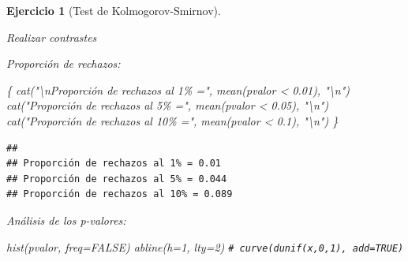 \documentclass[
]{book}
\newenvironment{Shaded}{\begin{snugshade}}{\end{snugshade}}
\newcommand{\AttributeTok}[1]{\textcolor[rgb]{0.77,0.63,0.00}{#1}}
\newcommand{\CommentTok}[1]{\textcolor[rgb]{0.56,0.35,0.01}{\textit{#1}}}
\newcommand{\ConstantTok}[1]{\textcolor[rgb]{0.00,0.00,0.00}{#1}}
\newcommand{\ControlFlowTok}[1]{\textcolor[rgb]{0.13,0.29,0.53}{\textbf{#1}}}
\newcommand{\DecValTok}[1]{\textcolor[rgb]{0.00,0.00,0.81}{#1}}
\newcommand{\FloatTok}[1]{\textcolor[rgb]{0.00,0.00,0.81}{#1}}
\newcommand{\FunctionTok}[1]{\textcolor[rgb]{0.00,0.00,0.00}{#1}}
\newcommand{\NormalTok}[1]{#1}
\newcommand{\OtherTok}[1]{\textcolor[rgb]{0.56,0.35,0.01}{#1}}
\newcommand{\SpecialCharTok}[1]{\textcolor[rgb]{0.00,0.00,0.00}{#1}}
\newcommand{\StringTok}[1]{\textcolor[rgb]{0.31,0.60,0.02}{#1}}
\theoremstyle{break}
\newtheorem{exercise}{Ejercicio}[chapter]
\theoremstyle{nonumberplain}
\renewcommand{\CommentTok}[1]{\textcolor[rgb]{0.41,0.41,0.41}{\texttt{#1}}}
\begin{document}
\begin{exercise}[Test de Kolmogorov-Smirnov]
\begin{enumerate}
  Realizar contrastes

\begin{Shaded}
\end{Shaded}

  Proporción de rechazos:

\begin{Shaded}
\begin{Highlighting}[]
\NormalTok{\{}
  \FunctionTok{cat}\NormalTok{(}\StringTok{"}\SpecialCharTok{\textbackslash{}n}\StringTok{Proporción de rechazos al 1\% ="}\NormalTok{, }\FunctionTok{mean}\NormalTok{(pvalor }\SpecialCharTok{\textless{}} \FloatTok{0.01}\NormalTok{), }\StringTok{"}\SpecialCharTok{\textbackslash{}n}\StringTok{"}\NormalTok{)}
  \FunctionTok{cat}\NormalTok{(}\StringTok{"Proporción de rechazos al 5\% ="}\NormalTok{, }\FunctionTok{mean}\NormalTok{(pvalor }\SpecialCharTok{\textless{}} \FloatTok{0.05}\NormalTok{), }\StringTok{"}\SpecialCharTok{\textbackslash{}n}\StringTok{"}\NormalTok{)}
  \FunctionTok{cat}\NormalTok{(}\StringTok{"Proporción de rechazos al 10\% ="}\NormalTok{, }\FunctionTok{mean}\NormalTok{(pvalor }\SpecialCharTok{\textless{}} \FloatTok{0.1}\NormalTok{), }\StringTok{"}\SpecialCharTok{\textbackslash{}n}\StringTok{"}\NormalTok{)}
\NormalTok{\}}
\end{Highlighting}
\end{Shaded}

\begin{verbatim}
## 
## Proporción de rechazos al 1% = 0.01 
## Proporción de rechazos al 5% = 0.044 
## Proporción de rechazos al 10% = 0.089
\end{verbatim}

  Análisis de los p-valores:

\begin{Shaded}
\begin{Highlighting}[]
\FunctionTok{hist}\NormalTok{(pvalor, }\AttributeTok{freq=}\ConstantTok{FALSE}\NormalTok{)}
\FunctionTok{abline}\NormalTok{(}\AttributeTok{h=}\DecValTok{1}\NormalTok{, }\AttributeTok{lty=}\DecValTok{2}\NormalTok{)   }\CommentTok{\# curve(dunif(x,0,1), add=TRUE)}
\end{Highlighting}
\end{Shaded}


\end{enumerate}
\end{exercise}
\end{document}
